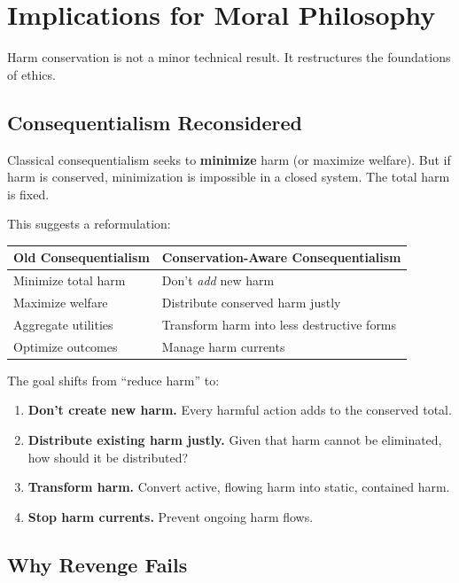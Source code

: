 \documentclass[12pt,letterpaper]{article}
\theoremstyle{definition}
\theoremstyle{remark}
\begin{document}
\section{Implications for Moral Philosophy}

Harm conservation is not a minor technical result. It restructures the foundations of ethics.

\subsection{Consequentialism Reconsidered}

Classical consequentialism seeks to \textbf{minimize} harm (or maximize welfare). But if harm is conserved, minimization is impossible in a closed system. The total harm is fixed.

This suggests a reformulation:

\begin{center}
\begin{tabular}{ll}
\toprule
\textbf{Old Consequentialism} & \textbf{Conservation-Aware Consequentialism} \\
\midrule
Minimize total harm & Don't \textit{add} new harm \\
Maximize welfare & Distribute conserved harm justly \\
Aggregate utilities & Transform harm into less destructive forms \\
Optimize outcomes & Manage harm currents \\
\bottomrule
\end{tabular}
\end{center}

The goal shifts from ``reduce harm'' to:
\begin{enumerate}
    \item \textbf{Don't create new harm.} Every harmful action adds to the conserved total.
    \item \textbf{Distribute existing harm justly.} Given that harm cannot be eliminated, how should it be distributed?
    \item \textbf{Transform harm.} Convert active, flowing harm into static, contained harm.
    \item \textbf{Stop harm currents.} Prevent ongoing harm flows.
\end{enumerate}

\subsection{Why Revenge Fails}
\end{document}

